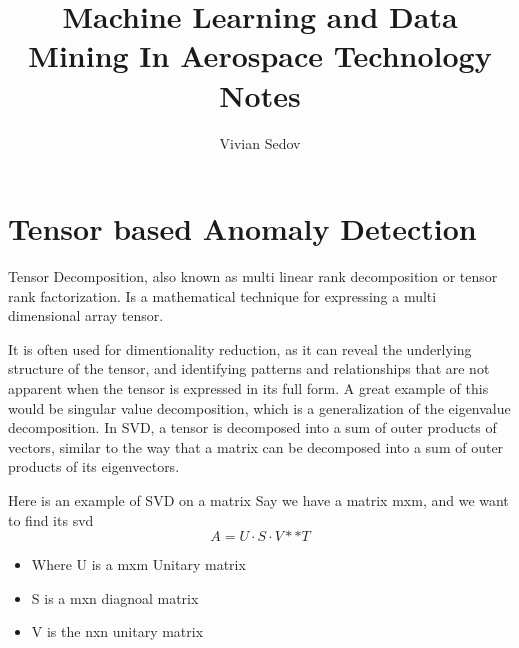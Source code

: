 \documentclass{article}
\title{Machine Learning and Data Mining In Aerospace Technology Notes}
\author{Vivian Sedov}
\theoremstyle{mytheoremstyle}
\theoremstyle{mytheoremstyle}
\theoremstyle{myproblemstyle}
\begin{document}
\maketitle
\tableofcontents
\newpage

\section{Tensor based Anomaly Detection}

\begin{definition}
	Tensor Decomposition, also known as multi linear rank decomposition or tensor rank factorization. Is a mathematical technique for expressing a multi dimensional array tensor.

	It is often used for dimentionality reduction, as it can reveal the underlying structure of the tensor, and identifying patterns and relationships that are not apparent when the tensor is expressed in its full form. A great example of this would be singular value decomposition, which is a generalization of the eigenvalue decomposition. In SVD, a tensor is decomposed into a sum of outer products of vectors, similar to the way that a matrix can be decomposed into a sum of outer products of its eigenvectors.

	Here is an example of SVD on a matrix
	Say we have a matrix mxm, and we want to find its svd
	\begin{displaymath}
		A = U \cdot S \cdot V**T
	\end{displaymath}
	\begin{itemize}
		\item Where U is a mxm Unitary matrix
		\item S is a mxn diagnoal matrix
		\item V is the nxn unitary matrix
	\end{itemize}

\end{definition}
\end{document}
